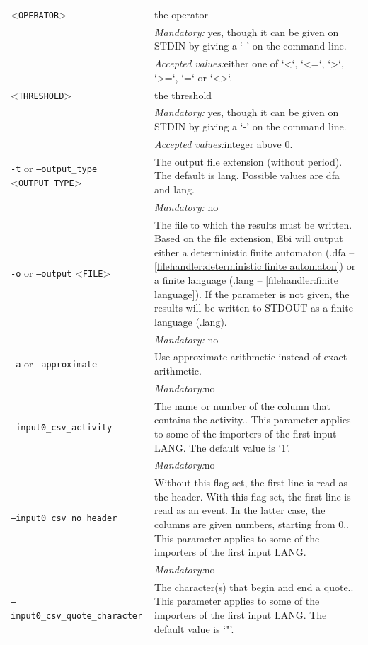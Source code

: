 {\begin{tabularx}{\linewidth}{lX}
<\texttt{OPERATOR}>&the operator\\
&\textit{Mandatory:} \quad yes, though it can be given on STDIN by giving a `-' on the command line.\\
&\textit{Accepted values:}\quad either one of `<`, `<=`, `>`, `>=`, `=` or `<>`.\\
<\texttt{THRESHOLD}>&the threshold\\
&\textit{Mandatory:} \quad yes, though it can be given on STDIN by giving a `-' on the command line.\\
&\textit{Accepted values:}\quad integer above 0.\\
\texttt{-t} or \texttt{--output\_type} <\texttt{OUTPUT\_TYPE}> &
The output file extension (without period). The default is lang. Possible values are dfa and lang.\\
&\textit{Mandatory:} \quad no\\
\texttt{-o} or \texttt{--output} <\texttt{FILE}> &
The file to which the results must be written. Based on the file extension, Ebi will output either a deterministic finite automaton (.dfa -- \cref{filehandler:deterministic finite automaton}) or a finite language (.lang -- \cref{filehandler:finite language}).
If the parameter is not given, the results will be written to STDOUT as a finite language (.lang).\\
&\textit{Mandatory:} \quad no\\
\texttt{-a} or \texttt{--approximate} & Use approximate arithmetic instead of exact arithmetic.\\
&\textit{Mandatory:}\quad no\\
\texttt{--input0\_csv\_activity} & The name or number of the column that contains the activity.. This parameter applies to some of the importers of the first input LANG. The default value is `1'.\\
&\textit{Mandatory:}\quad no\\
\texttt{--input0\_csv\_no\_header} & Without this flag set, the first line is read as the header. 
    With this flag set, the first line is read as an event. In the latter case, the columns are given numbers, starting from 0.. This parameter applies to some of the importers of the first input LANG. \\
&\textit{Mandatory:}\quad no\\
\texttt{--input0\_csv\_quote\_character} & The character(s) that begin and end a quote.. This parameter applies to some of the importers of the first input LANG. The default value is `"'.\\

\end{tabularx}}
